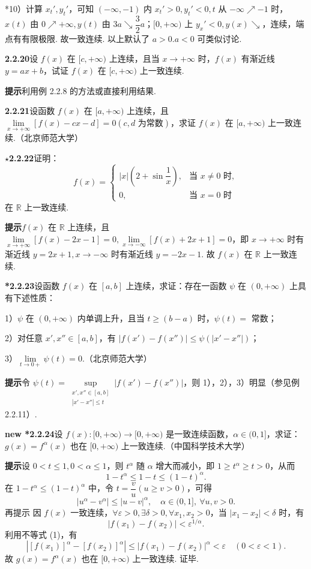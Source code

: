 \documentclass[UTF8, 12pt, fontset=fandol, oneside]{ctexart}
\begin{document}
*10）计算 $x_t',y_t'$，可知 $(-\infty,-1)$ 内 $x_t'>0,y_t'<0,t$ 从 $-\infty\nearrow -1$ 时，$x(t)$ 由 $0\nearrow+\infty,y(t)$ 由
  $3a\searrow\dfrac32a$；$[0,+\infty)$ 上 $y_x'<0,y(x)\searrow$，连续，端点有有限极限. 故一致连续. 以上默认了 $a>0.a<0$ 可类似讨论.

\noindent\textbf{2.2.20}\quad 设 $f(x)$ 在 $[c,+\infty)$ 上连续，且当 $x\to+\infty$ 时，$f(x)$ 有渐近线 $y=ax+b$，试证 $f(x)$ 在 $[c,+\infty)$ 上一致连续.

\noindent\textbf{提示}\quad 利用例 2.2.8 的方法或直接利用结果.

\noindent\textbf{2.2.21}\quad 设函数 $f(x)$ 在 $[a,+\infty)$ 上连续，且 $\lim\limits_{x\to+\infty}[f(x)-cx-d]=0(c,d\text{ 为常数})$，求证 $f(x)$ 在 $[a,+\infty)$ 上一致连续.（北京师范大学）

\noindent\textbf{$\star$2.2.22}\quad 证明：
\[
  f(x)=
  \begin{cases}
    |x|\left(2+\sin\dfrac1x\right), & \text{当 }x\ne0\text{ 时},\\
    0, & \text{当 }x=0\text{ 时}
  \end{cases}
\]
在 $\mathbb{R}$ 上一致连续.

\noindent\textbf{提示}\quad $f(x)$ 在 $\mathbb{R}$ 上连续，且 $\lim\limits_{x\to+\infty}[f(x)-2x-1]=0,\lim\limits_{x\to-\infty}[f(x)+2x+1]=0$，即 $x\to+\infty$ 时有渐近线 $y=2x+1,x\to-\infty$ 时有渐近线 $y=-2x-1$. 故 $f(x)$ 在 $\mathbb{R}$ 上一致连续.

\noindent\textbf{*2.2.23}\quad 设函数 $f(x)$ 在 $[a,b]$ 上连续，求证：存在一函数 $\psi$ 在 $(0,+\infty)$ 上具有下述性质：

1）$\psi$ 在 $(0,+\infty)$ 内单调上升，且当 $t\ge(b-a)$ 时，$\psi(t)=$ 常数；

2）对任意 $x',x''\in[a,b]$，有 $|f(x')-f(x'')|\le\psi(|x'-x''|)$；

3）$\lim\limits_{t\to0+}\psi(t)=0$.（北京师范大学）

\noindent\textbf{提示}\quad 令 $\psi(t)=\sup\limits_{\substack{x',x''\in[a,b]\\ |x'-x''|\le t}}|f(x')-f(x'')|$，则 1），2），3）明显（参见例 2.2.11）.

\noindent\textbf{new *2.2.24}\quad 设 $f(x):[0,+\infty)\to[0,+\infty)$ 是一致连续函数，$\alpha\in(0,1]$，求证：$g(x)=f^\alpha(x)$ 也在 $[0,+\infty)$ 上一致连续.（中国科学技术大学）

\noindent\textbf{提示}\quad 设 $0<t\le1,0<\alpha\le1$，则 $t^\alpha$ 随 $\alpha$ 增大而减小，即 $1\ge t^\alpha\ge t>0$，从而
\[
  1-t^\alpha\le1-t\le(1-t)^\alpha.
\]
在 $1-t^\alpha\le(1-t)^\alpha$ 中，令 $t=\dfrac vu(u\ge v>0)$，可得
\[
  |u^\alpha-v^\alpha|\le |u-v|^\alpha,\quad \alpha\in(0,1],\ \forall u,v>0. \tag{1}
\]
再提示 因 $f(x)$ 一致连续，$\forall\varepsilon>0,\exists\delta>0,\forall x_1,x_2>0$，当 $|x_1-x_2|<\delta$ 时，有
\[
  |f(x_1)-f(x_2)|<\varepsilon^{1/\alpha}.
\]
利用不等式 (1)，有
\[
  |[f(x_1)]^\alpha-[f(x_2)]^\alpha|\le |f(x_1)-f(x_2)|^\alpha<\varepsilon\quad(0<\varepsilon<1).
\]
故 $g(x)=f^\alpha(x)$ 也在 $[0,+\infty)$ 上一致连续. 证毕.
\end{document}
